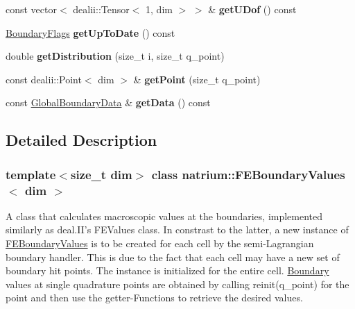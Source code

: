 \begin{DoxyCompactItemize}
\item 
\hypertarget{classnatrium_1_1FEBoundaryValues_a4f3396a993006cbcc8150e6ce4551e95}{
const vector$<$ dealii::Tensor$<$ 1, dim $>$ $>$ \& {\bfseries getUDof} () const }
\label{classnatrium_1_1FEBoundaryValues_a4f3396a993006cbcc8150e6ce4551e95}

\item 
\hypertarget{classnatrium_1_1FEBoundaryValues_a28350e357b7f07bf30ac57372b5aeb86}{
\hyperlink{namespacenatrium_a93b2a3d564675413b9f6cc88c60f46af}{BoundaryFlags} {\bfseries getUpToDate} () const }
\label{classnatrium_1_1FEBoundaryValues_a28350e357b7f07bf30ac57372b5aeb86}

\item 
\hypertarget{classnatrium_1_1FEBoundaryValues_a6f1482dafa9ce2f99678625a438f364a}{
double {\bfseries getDistribution} (size\_\-t i, size\_\-t q\_\-point)}
\label{classnatrium_1_1FEBoundaryValues_a6f1482dafa9ce2f99678625a438f364a}

\item 
\hypertarget{classnatrium_1_1FEBoundaryValues_a12812ab663d3b50cbcba1e0c6077cf46}{
const dealii::Point$<$ dim $>$ \& {\bfseries getPoint} (size\_\-t q\_\-point)}
\label{classnatrium_1_1FEBoundaryValues_a12812ab663d3b50cbcba1e0c6077cf46}

\item 
\hypertarget{classnatrium_1_1FEBoundaryValues_aca8692735010e37b0795e0a979ae59e9}{
const \hyperlink{structnatrium_1_1GlobalBoundaryData}{GlobalBoundaryData} \& {\bfseries getData} () const }
\label{classnatrium_1_1FEBoundaryValues_aca8692735010e37b0795e0a979ae59e9}

\end{DoxyCompactItemize}


\subsection{Detailed Description}
\subsubsection*{template$<$size\_\-t dim$>$ class natrium::FEBoundaryValues$<$ dim $>$}

A class that calculates macroscopic values at the boundaries, implemented similarly as deal.II's FEValues class. In constrast to the latter, a new instance of \hyperlink{classnatrium_1_1FEBoundaryValues}{FEBoundaryValues} is to be created for each cell by the semi-\/Lagrangian boundary handler. This is due to the fact that each cell may have a new set of boundary hit points. The instance is initialized for the entire cell. \hyperlink{classnatrium_1_1Boundary}{Boundary} values at single quadrature points are obtained by calling reinit(q\_\-point) for the point and then use the getter-\/Functions to retrieve the desired values. 

